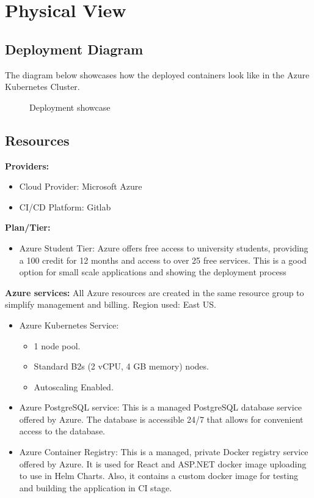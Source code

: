 \documentclass[
    english, %
]{VUMIFPSkursinis}
\begin{document}
\section{Physical View}

\subsection{Deployment Diagram}

The diagram below showcases how the deployed containers look like in the Azure Kubernetes Cluster.

\begin{figure}[ht]
    \centering
    
    \label{deployment-showcase}
    \caption{Deployment showcase}
\end{figure}

\subsection{Resources}

\textbf{Providers:}
\begin{itemize}
    \item Cloud Provider: Microsoft Azure
    \item CI/CD Platform: Gitlab
\end{itemize}

\textbf{Plan/Tier:}
\begin{itemize}
    \item Azure Student Tier: Azure offers free access to university students, providing a 100 credit for 12 months and access to over 25 free services. This is a good option for small scale applications and showing the deployment process
\end{itemize}

\textbf{Azure services:}
All Azure resources are created in the same resource group to simplify management and billing. Region used: East US.
\begin{itemize}
    \item Azure Kubernetes Service:
        \begin{itemize}
            \item 1 node pool.
            \item Standard B2s (2 vCPU, 4 GB memory) nodes.
            \item Autoscaling Enabled.
        \end{itemize}
    \item Azure PostgreSQL service: This is a managed PostgreSQL database service offered by Azure. The database is accessible 24/7 that allows for convenient access to the database.
    \item Azure Container Registry: This is a managed, private Docker registry service offered by Azure. It is used for React and ASP.NET docker image uploading to use in Helm Charts. Also, it contains a custom docker image for testing and building the application in CI stage.
\end{itemize}
\end{document}
